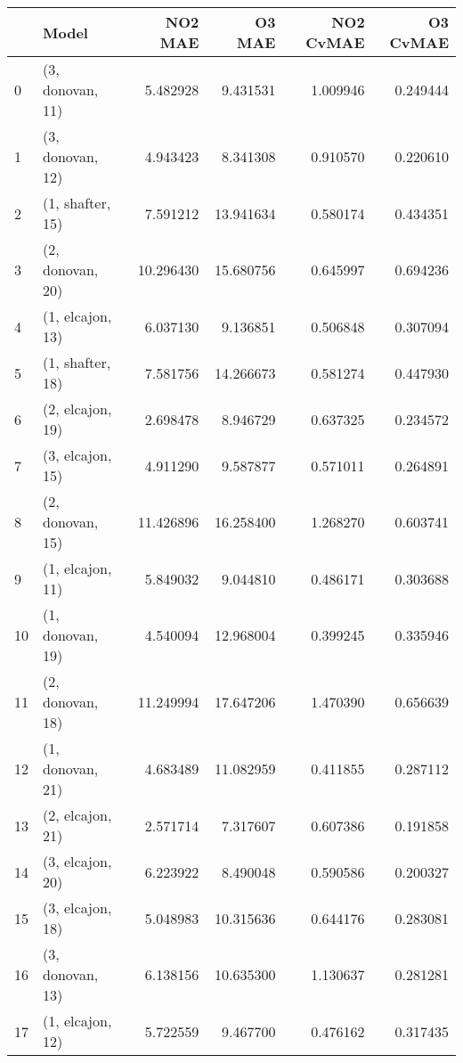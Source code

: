 \begin{tabular}{llrrrr}
\toprule
{} &             Model &    NO2 MAE &     O3 MAE &  NO2 CvMAE &  O3 CvMAE \\
\midrule
0  &  (3, donovan, 11) &   5.482928 &   9.431531 &   1.009946 &  0.249444 \\
1  &  (3, donovan, 12) &   4.943423 &   8.341308 &   0.910570 &  0.220610 \\
2  &  (1, shafter, 15) &   7.591212 &  13.941634 &   0.580174 &  0.434351 \\
3  &  (2, donovan, 20) &  10.296430 &  15.680756 &   0.645997 &  0.694236 \\
4  &  (1, elcajon, 13) &   6.037130 &   9.136851 &   0.506848 &  0.307094 \\
5  &  (1, shafter, 18) &   7.581756 &  14.266673 &   0.581274 &  0.447930 \\
6  &  (2, elcajon, 19) &   2.698478 &   8.946729 &   0.637325 &  0.234572 \\
7  &  (3, elcajon, 15) &   4.911290 &   9.587877 &   0.571011 &  0.264891 \\
8  &  (2, donovan, 15) &  11.426896 &  16.258400 &   1.268270 &  0.603741 \\
9  &  (1, elcajon, 11) &   5.849032 &   9.044810 &   0.486171 &  0.303688 \\
10 &  (1, donovan, 19) &   4.540094 &  12.968004 &   0.399245 &  0.335946 \\
11 &  (2, donovan, 18) &  11.249994 &  17.647206 &   1.470390 &  0.656639 \\
12 &  (1, donovan, 21) &   4.683489 &  11.082959 &   0.411855 &  0.287112 \\
13 &  (2, elcajon, 21) &   2.571714 &   7.317607 &   0.607386 &  0.191858 \\
14 &  (3, elcajon, 20) &   6.223922 &   8.490048 &   0.590586 &  0.200327 \\
15 &  (3, elcajon, 18) &   5.048983 &  10.315636 &   0.644176 &  0.283081 \\
16 &  (3, donovan, 13) &   6.138156 &  10.635300 &   1.130637 &  0.281281 \\
17 &  (1, elcajon, 12) &   5.722559 &   9.467700 &   0.476162 &  0.317435 \\
\bottomrule
\end{tabular}
